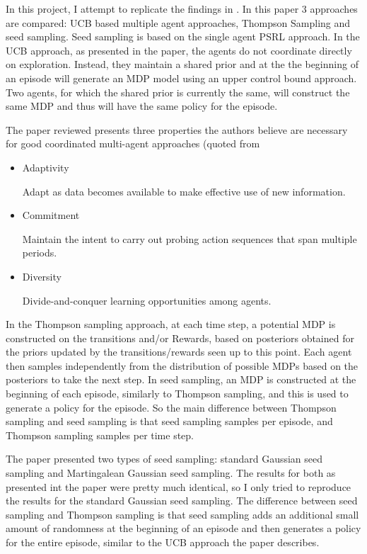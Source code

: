 \documentclass{article}
\begin{document}
In this project, I attempt to replicate the findings in \cite{SeedSampling}. In this paper 3 approaches are compared: UCB based multiple agent approaches, Thompson Sampling and seed sampling. Seed sampling is based on the single agent PSRL approach.  In the UCB approach, as presented in the paper, the agents do not coordinate directly on exploration. Instead, they maintain a shared prior  and at the the beginning of an episode will generate an MDP model using an upper control bound approach.  Two agents, for which the shared prior is currently the same, will construct the same MDP and thus will have the same policy for the episode.

The paper reviewed presents three properties the authors believe are necessary for good coordinated multi-agent approaches (quoted from \cite{SeedSampling}
\begin{itemize}
\item Adaptivity

Adapt as data becomes available to make effective use of new
information.

\item Commitment

Maintain the intent to carry out probing action sequences
that span multiple periods.

\item Diversity

Divide-and-conquer learning opportunities among agents.

\end{itemize}

In the Thompson sampling approach, at each time step, a potential MDP is constructed on the transitions and/or Rewards, based on posteriors obtained for the priors updated by the transitions/rewards seen up to this point. Each agent then samples independently from the distribution of possible MDPs based on the posteriors to take the next step. In seed sampling, an MDP is constructed at the beginning of each episode, similarly to Thompson sampling, and this is used to generate a policy for the episode. So the main difference between Thompson sampling and seed sampling is that seed sampling samples per episode, and Thompson sampling samples per time step.

The paper presented two types of seed sampling: standard Gaussian seed sampling and Martingalean Gaussian seed sampling. The results for both as presented int the paper were pretty much identical, so I only tried to reproduce the results for the standard Gaussian seed sampling. The difference between seed sampling and Thompson sampling is that seed sampling adds an additional small amount of randomness at the beginning of an episode and then generates a policy for the entire episode, similar to the UCB approach the paper describes.
\end{document}
